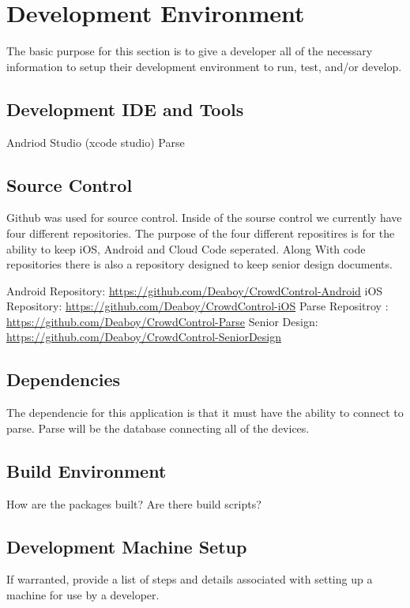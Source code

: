 \chapter{Development Environment}
The basic purpose for this section is to give a developer all of the necessary 
information to setup their development environment to run, test, and/or develop. 


\section{Development IDE and Tools}
Andriod Studio \newline
(xcode studio) \newline
Parse \newline

\section{Source  Control}
Github was used for source control. Inside of the sourse control we currently have four different repositories. The purpose of the four different repositires is for the ability to keep iOS, Android and Cloud Code seperated. Along With code repositories there is also a repository designed to keep senior design documents.
\newline


\noindent Android Repository:  \url{https://github.com/Deaboy/CrowdControl-Android} \newline
iOS Repository: \url{https://github.com/Deaboy/CrowdControl-iOS} \newline
Parse Repositroy : \url{https://github.com/Deaboy/CrowdControl-Parse} \newline
Senior Design: \url{https://github.com/Deaboy/CrowdControl-SeniorDesign}

\section{Dependencies}
The dependencie for this application is that it must have the ability to connect to parse. Parse will be the database connecting all of the devices.

\section{Build  Environment}
How are the packages built?  Are there build scripts? 

\section{Development Machine Setup}
If warranted, provide a list of steps and details associated with setting up a 
machine for use by a developer. 

